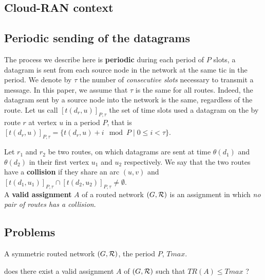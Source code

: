 \documentclass[english]{article}
\begin{document}
  \subsection{Cloud-RAN context}
     

     
  \subsection{Periodic sending of the datagrams}
 The process we describe here is \textbf{periodic} during each period of $P$ slots, a datagram is sent from each source node in the network at the same tic in the period.
             We denote by $\tau$ the number 
      of \emph{consecutive slots} necessary to transmit a message. In this paper, we assume that $\tau$ is the same for all routes. Indeed, the datagram sent by a source node into the network is the same, regardless of the route. Let us call $[t(d_r,u)]_{P,\tau}$ the set of time slots used a datagram on the by route $r$ at vertex $u$ in a period $P$, that is $[t(d_r,u)]_{P,\tau} = \{t(d_r,u) + i \mod P \mid 0 \leq i < \tau \}$. 

      Let $r_1$ and $r_2$ be two routes, on which datagrams are sent at time $\theta(d_1)$ and $\theta(d_2)$ in their first vertex $u_1$ and $u_2$ respectively.
      We say that the two routes have a {\bf collision} if they share an arc $(u,v)$ and $[t(d_1,u_1)]_{P,\tau} \cap [t(d_2,u_2)]_{P,\tau} \neq \emptyset$.\\

        A {\bf valid assignment} $A$ of a routed network $(G,\cal R)$ is an assignment in which \emph{no pair of routes has a collision}.
        
\subsection{Problems}
       

        A symmetric routed network $(G,{\cal R})$, the period $P$, $Tmax$.
      
       does there exist a valid assignment $A$ of $(G,{\cal R})$ such that $ TR(A) \leq Tmax$ ?
\end{document}
